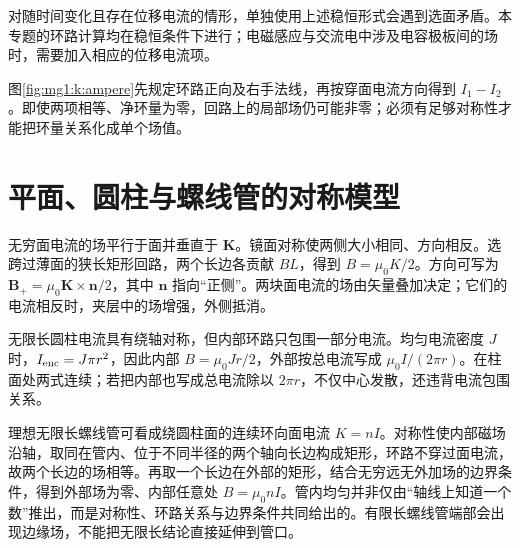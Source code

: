 对随时间变化且存在位移电流的情形，单独使用上述稳恒形式会遇到选面矛盾。本专题的环路计算均在稳恒条件下进行；电磁感应与交流电中涉及电容极板间的场时，需要加入相应的位移电流项。


图\ref{fig:mg1:k:ampere}先规定环路正向及右手法线，再按穿面电流方向得到 $I_1-I_2$。即使两项相等、净环量为零，回路上的局部场仍可能非零；必须有足够对称性才能把环量关系化成单个场值。


\section{平面、圆柱与螺线管的对称模型}
无穷面电流的场平行于面并垂直于 $\bm K$。镜面对称使两侧大小相同、方向相反。选跨过薄面的狭长矩形回路，两个长边各贡献 $BL$，得到 $B=\mu_0K/2$。方向可写为 $\bm B_+=\mu_0\bm K\times\bm n/2$，其中 $\bm n$ 指向“正侧”。两块面电流的场由矢量叠加决定；它们的电流相反时，夹层中的场增强，外侧抵消。


无限长圆柱电流具有绕轴对称，但内部环路只包围一部分电流。均匀电流密度 $J$ 时，$I_{\rm enc}=J\pi r^2$，因此内部 $B=\mu_0Jr/2$，外部按总电流写成 $\mu_0I/(2\pi r)$。在柱面处两式连续；若把内部也写成总电流除以 $2\pi r$，不仅中心发散，还违背电流包围关系。


理想无限长螺线管可看成绕圆柱面的连续环向面电流 $K=nI$。对称性使内部磁场沿轴，取同在管内、位于不同半径的两个轴向长边构成矩形，环路不穿过面电流，故两个长边的场相等。再取一个长边在外部的矩形，结合无穷远无外加场的边界条件，得到外部场为零、内部任意处 $B=\mu_0nI$。管内均匀并非仅由“轴线上知道一个数”推出，而是对称性、环路关系与边界条件共同给出的。有限长螺线管端部会出现边缘场，不能把无限长结论直接延伸到管口。


